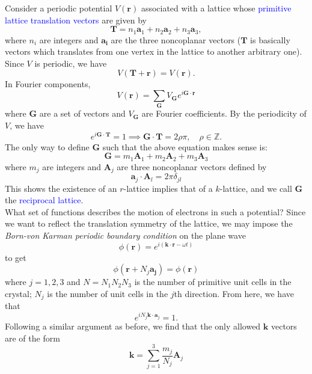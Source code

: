 \documentclass{book}
\theoremstyle{definition}
\newcommand{\f}[2]{\frac{#1}{#2}}
\begin{document}
Consider a periodic potential $V(\mathbf{r})$ associated with a lattice whose \textcolor{blue}{primitive lattice translation vectors} are given by 
\begin{equation*}
\mathbf{T} = n_1 \mathbf{a}_1 +  n_2 \mathbf{a}_2  +  n_3 \mathbf{a}_3,
\end{equation*}
where $n_i$ are integers and $\mathbf{a_i}$ are the three noncoplanar vectors ($\mathbf{T}$ is basically vectors which translates from one vertex in the lattice to another arbitrary one). Since $V$ is periodic, we have
\begin{equation*}
V(\mathbf{T} + \mathbf{r}) = V(\mathbf{r}). 
\end{equation*}
In Fourier components, 
\begin{equation*}
V(\mathbf{r}) = \sum_\mathbf{G} V_\mathbf{G} e^{i\mathbf{G}\cdot \mathbf{r}}
\end{equation*}
where $\mathbf{G}$ are a set of vectors and $V_\mathbf{G}$ are Fourier coefficients. By the periodicity of $V$, we have
\begin{equation*}
e^{i\mathbf{G}\cdot \mathbf{T}} = 1 \implies \mathbf{G}\cdot \mathbf{T} = 2\rho \pi, \quad \rho \in \mathbb{Z}.
\end{equation*}
The only way to define $\mathbf{G}$ such that the above equation makes sense is:
\begin{equation*}
\mathbf{G} = m_1 \mathbf{A}_1 + m_2 \mathbf{A}_2 + m_3 \mathbf{A}_3
\end{equation*}
where $m_j$ are integers and $\mathbf{A}_j$ are three noncoplanar vectors defined by 
\begin{equation*}
\mathbf{a}_j \cdot \mathbf{A}_l = 2\pi \delta_{jl}
\end{equation*}
This shows the existence of an $r$-lattice implies that of a $k$-lattice, and we call $\mathbf{G}$ the \textcolor{blue}{reciprocal lattice}. \\


What set of functions describes the motion of electrons in such a potential? Since we want to reflect the translation symmetry of the lattice, we may impose the \textit{Born-von Karman periodic boundary condition} on the plane wave 
\begin{equation*}
\phi(\mathbf{r}) = e^{i(\mathbf{k}\cdot \mathbf{r} - \omega t)}
\end{equation*}
to get
\begin{equation*}
\phi(\mathbf{r} + N_j \mathbf{a_j}) = \phi(\mathbf{r})
\end{equation*}
where $j=1,2,3$ and $N = N_1N_2N_3$ is the number of primitive unit cells in the crystal; $N_j$ is the number of unit cells in the $j$th direction. From here, we have that 
\begin{equation*}
e^{iN_j \mathbf{k}\cdot \mathbf{a}_j} = 1.
\end{equation*}
Following a similar argument as before, we find that the only allowed $\mathbf{k}$ vectors are of the form
\begin{equation*}
\mathbf{k} = \sum^3_{j=1}\f{m_j}{N_j}\mathbf{A}_j
\end{equation*}
\end{document}
